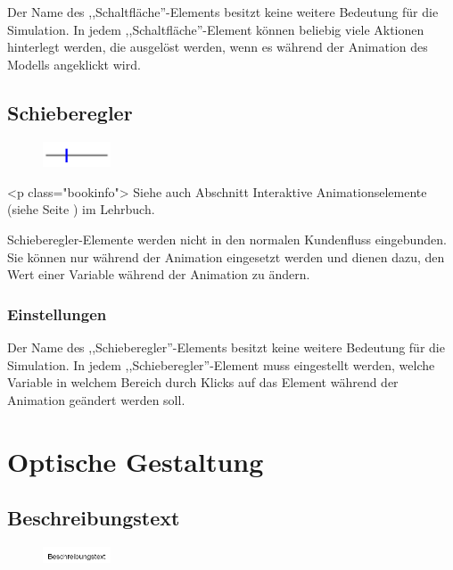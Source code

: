 Der Name des ,,Schaltfläche''-Elements besitzt keine weitere Bedeutung für die Simulation.
In jedem ,,Schaltfläche''-Element können beliebig viele Aktionen hinterlegt werden, die
ausgelöst werden, wenn es während der Animation des Modells angeklickt wird.


\section{Schieberegler}
\label{ref:ModelElementInteractiveSlider}

\begin{figure}
\vspace{-22pt}
\includegraphics[width=2cm]{imageModelElementInteractiveSlider.png}
\vspace{-22pt}
\end{figure}

<p class="bookinfo">
Siehe auch Abschnitt Interaktive Animationselemente (siehe Seite \pageref{ref:book:8.12.4}) im Lehrbuch.

Schieberegler-Elemente werden nicht in den normalen Kundenfluss eingebunden.
Sie können nur während der Animation eingesetzt werden und dienen dazu,
den Wert einer Variable während der Animation zu ändern.

\subsection*{Einstellungen}

Der Name des ,,Schieberegler''-Elements besitzt keine weitere Bedeutung für die Simulation.
In jedem ,,Schieberegler''-Element muss eingestellt werden, welche Variable in welchem
Bereich durch Klicks auf das Element während der Animation geändert werden soll.





\chapter{Optische Gestaltung}

\section{Beschreibungstext}
\label{ref:ModelElementText}

\begin{figure}
\vspace{-22pt}
\includegraphics[width=2cm]{imageModelElementText.png}
\vspace{-22pt}
\end{figure}

